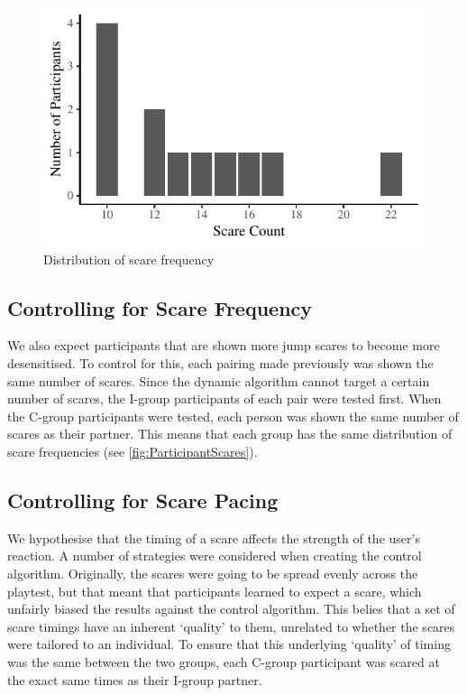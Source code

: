 \documentclass[12pt,a4paper]{article}\usepackage[]{graphicx}\usepackage[]{color}
\makeatletter
\def\maxwidth{ %
  \ifdim\Gin@nat@width>\linewidth
    \linewidth
  \else
    \Gin@nat@width
  \fi
}
\makeatother
\begin{document}
\begin{figure}
	\vspace{-10pt}


{\centering \includegraphics[width=\maxwidth]{figure/ParticipantScares-1} 

}



	\caption{Distribution of scare frequency}
	\label{fig:ParticipantScares}
\end{figure}


\subsection{Controlling for Scare Frequency}

We also expect participants that are shown more jump scares to become more desensitised.
To control for this, each pairing made previously was shown the same number of scares.
Since the dynamic algorithm cannot target a certain number of scares, the I-group participants of each pair were tested first.
When the C-group participants were tested, each person was shown the same number of scares as their partner.
This means that each group has the same distribution of scare frequencies (see \vref{fig:ParticipantScares}).

\subsection{Controlling for Scare Pacing}

We hypothesise that the timing of a scare affects the strength of the user's reaction.
A number of strategies were considered when creating the control algorithm.
Originally, the scares were going to be spread evenly across the playtest, but that meant that participants learned to expect a scare, which unfairly biased the results against the control algorithm.
This belies that a set of scare timings have an inherent `quality' to them, unrelated to whether the scares were tailored to an individual.
To ensure that this underlying `quality' of timing was the same between the two groups, each C-group participant was scared at the exact same times as their I-group partner.
\end{document}
